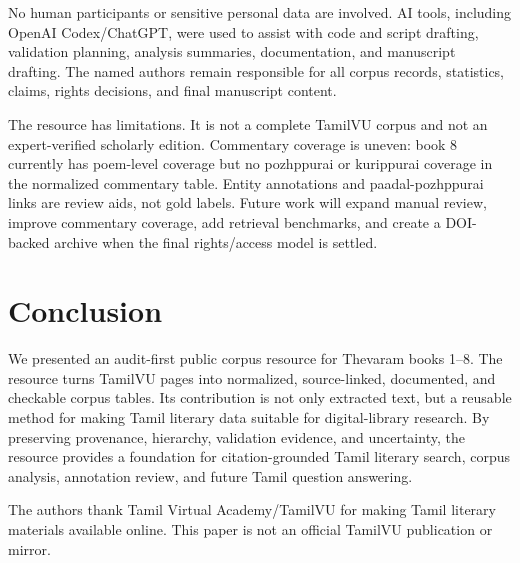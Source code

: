 \documentclass[sigconf]{acmart}
\begin{document}
No human participants or sensitive personal data are involved. AI tools, including OpenAI Codex/ChatGPT, were used to assist with code and script drafting, validation planning, analysis summaries, documentation, and manuscript drafting. The named authors remain responsible for all corpus records, statistics, claims, rights decisions, and final manuscript content.

The resource has limitations. It is not a complete TamilVU corpus and not an expert-verified scholarly edition. Commentary coverage is uneven: book 8 currently has poem-level coverage but no pozhppurai or kurippurai coverage in the normalized commentary table. Entity annotations and paadal-pozhppurai links are review aids, not gold labels. Future work will expand manual review, improve commentary coverage, add retrieval benchmarks, and create a DOI-backed archive when the final rights/access model is settled.

\section{Conclusion}

We presented an audit-first public corpus resource for Thevaram books 1--8. The resource turns TamilVU pages into normalized, source-linked, documented, and checkable corpus tables. Its contribution is not only extracted text, but a reusable method for making Tamil literary data suitable for digital-library research. By preserving provenance, hierarchy, validation evidence, and uncertainty, the resource provides a foundation for citation-grounded Tamil literary search, corpus analysis, annotation review, and future Tamil question answering.

\begin{acks}
The authors thank Tamil Virtual Academy/TamilVU for making Tamil literary materials available online. This paper is not an official TamilVU publication or mirror.
\end{acks}



\end{document}
